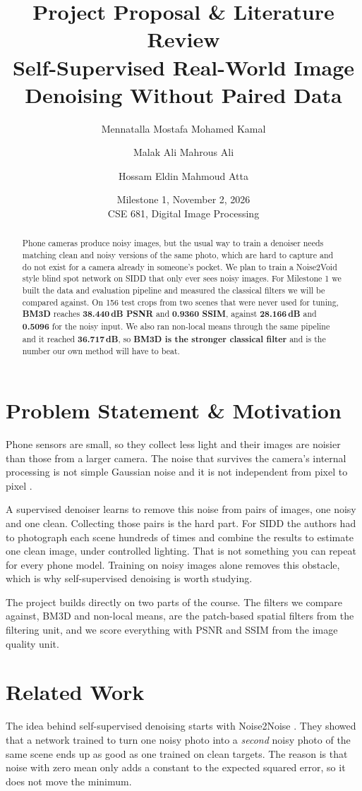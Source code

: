 \documentclass[11pt]{article}
\title{\LARGE Project Proposal \& Literature Review \\[4pt]
\large Self-Supervised Real-World Image Denoising Without Paired Data}
\author{
  Mennatalla Mostafa Mohamed Kamal \and
  Malak Ali Mahrous Ali \and
  Hossam Eldin Mahmoud Atta
}
\date{Milestone 1, November 2, 2026 \\{} CSE 681, Digital Image Processing}
\begin{document}
\maketitle

\begin{abstract}
Phone cameras produce noisy images, but the usual way to train a denoiser needs matching
clean and noisy versions of the same photo, which are hard to capture and do not exist for
a camera already in someone's pocket. We plan to train a Noise2Void style blind spot
network on SIDD that only ever sees noisy images. For Milestone 1 we built the data and
evaluation pipeline and measured the classical filters we will be compared against. On 156
test crops from two scenes that were never used for tuning, \textbf{BM3D} reaches \textbf{38.440\,dB PSNR}
and \textbf{0.9360 SSIM}, against \textbf{28.166\,dB} and \textbf{0.5096} for the noisy input. We also ran non-local
means through the same pipeline and it reached \textbf{36.717\,dB}, so \textbf{BM3D is the stronger
classical filter} and is the number our own method will have to beat.
\end{abstract}

\section{Problem Statement \& Motivation}
\label{sec:motivation}
Phone sensors are small, so they collect less light and their images are noisier than
those from a larger camera. The noise that survives the camera's internal processing is
not simple Gaussian noise and it is not independent from pixel to pixel
\citep{abdelhamed2018sidd}.

A supervised denoiser learns to remove this noise from pairs of images, one noisy and one
clean. Collecting those pairs is the hard part. For SIDD the authors had to photograph
each scene hundreds of times and combine the results to estimate one clean image, under
controlled lighting. That is not something you can repeat for every phone model. Training
on noisy images alone removes this obstacle, which is why self-supervised denoising is
worth studying.

The project builds directly on two parts of the course. The filters we compare against,
BM3D and non-local means, are the patch-based spatial filters from the filtering unit, and
we score everything with PSNR and SSIM from the image quality unit.

\section{Related Work}
\label{sec:related}
The idea behind self-supervised denoising starts with Noise2Noise
\citep{lehtinen2018noise2noise}. They showed that a network trained to turn one noisy photo
into a \emph{second} noisy photo of the same scene ends up as good as one trained on clean
targets. The reason is that noise with zero mean only adds a constant to the expected
squared error, so it does not move the minimum.
\end{document}
